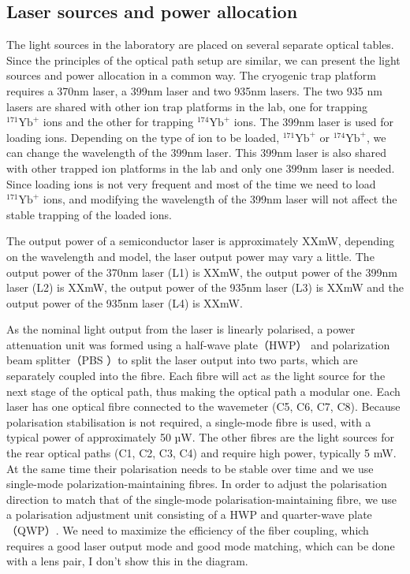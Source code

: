 \subsection{Laser sources and power allocation}

The light sources in the laboratory are placed on several separate optical tables. Since the principles of the optical path setup are similar, we can present the light sources and power allocation in a common way. The cryogenic trap platform requires a 370nm laser, a 399nm laser and two 935nm lasers. The two 935 nm lasers are shared with other ion trap platforms in the lab, one for trapping ${ }^{171} \mathrm{Yb}^{+}$ ions and the other for trapping ${ }^{174} \mathrm{Yb}^{+}$ ions. The 399nm laser is used for loading ions. Depending on the type of ion to be loaded, ${ }^{171} \mathrm{Yb}^{+}$ or ${ }^{174} \mathrm{Yb}^{+}$, we can change the wavelength of the 399nm laser. This 399nm laser is also shared with other trapped ion platforms in the lab and only one 399nm laser is needed. Since loading ions is not very frequent and most of the time we need to load ${ }^{171} \mathrm{Yb}^{+}$ ions, and modifying the wavelength of the 399nm laser will not affect the stable trapping of the loaded ions.

The output power of a semiconductor laser is approximately XXmW, depending on the wavelength and model, the laser output power may vary a little. The output power of the 370nm laser (L1) is XXmW, the output power of the 399nm laser (L2) is XXmW, the output power of the 935nm laser (L3) is XXmW and the output power of the 935nm laser (L4) is XXmW.

As the nominal light output from the laser is linearly polarised, a power attenuation unit was formed using a half-wave plate（HWP） and polarization beam splitter（PBS ）to split the laser output into two parts, which are separately coupled into the fibre. Each fibre will act as the light source for the next stage of the optical path, thus making the optical path a modular one. Each laser has one optical fibre connected to the wavemeter (C5, C6, C7, C8). Because polarisation stabilisation is not required, a single-mode fibre is used, with a typical power of approximately 50 µW. The other fibres are the light sources for the rear optical paths (C1, C2, C3, C4) and require high power, typically 5 mW. At the same time their polarisation needs to be stable over time and we use single-mode polarization-maintaining fibres. In order to adjust the polarisation direction to match that of the single-mode polarisation-maintaining fibre, we use a polarisation adjustment unit consisting of a HWP and quarter-wave plate（QWP）. We need to maximize the efficiency of the fiber coupling, which requires a good laser output mode and good mode matching, which can be done with a lens pair, I don't show this in the diagram.

